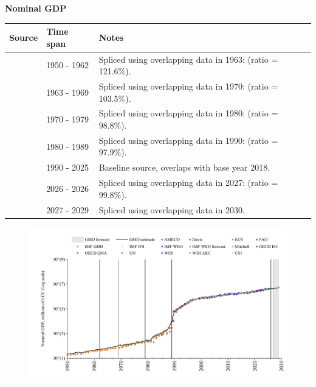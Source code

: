 \documentclass[12pt,a4paper,landscape]{article}
\begin{document}
\begin{adjustbox}{max totalsize={\paperwidth}{\paperheight},center}
\begin{minipage}[t][\textheight][t]{\textwidth}
\vspace*{0.5cm}
{}
\begin{center}
{\Large\bfseries Nominal GDP}
\end{center}
\vspace{0.5cm}
\begin{table}[H]
\centering
\small
\begin{tabular}{|l|l|l|}
\hline
\textbf{Source} & \textbf{Time span} & \textbf{Notes} \\
\hline
\rowcolor{white}\cite{Mitchell}& 1950 - 1962 &Spliced using overlapping data in 1963: (ratio = 121.6\%). \\
\rowcolor{lightgray}\cite{IMF_GDD}& 1963 - 1969 &Spliced using overlapping data in 1970: (ratio = 103.5\%). \\
\rowcolor{white}\cite{UN}& 1970 - 1979 &Spliced using overlapping data in 1980: (ratio = 98.8\%). \\
\rowcolor{lightgray}\cite{AMECO}& 1980 - 1989 &Spliced using overlapping data in 1990: (ratio = 97.9\%). \\
\rowcolor{white}\cite{OECD_EO}& 1990 - 2025 &Baseline source, overlaps with base year 2018. \\
\rowcolor{lightgray}\cite{AMECO}& 2026 - 2026 &Spliced using overlapping data in 2027: (ratio = 99.8\%). \\
\rowcolor{white}\cite{IMF_WEO_forecast}& 2027 - 2029 &Spliced using overlapping data in 2030. \\
\hline
\end{tabular}
\end{table}
\begin{figure}[H]
\centering
\includegraphics[width=\textwidth,height=0.6\textheight,keepaspectratio]{graphs/POL_nGDP.pdf}
\end{figure}
\end{minipage}
\end{adjustbox}
\end{document}
